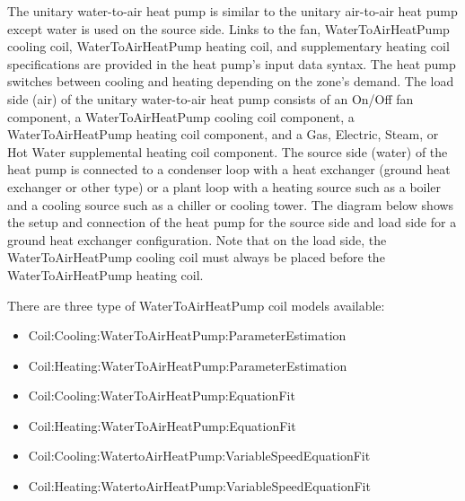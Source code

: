 The unitary water-to-air heat pump is similar to the unitary air-to-air heat pump except water is used on the source side. Links to the fan, WaterToAirHeatPump cooling coil, WaterToAirHeatPump heating coil, and supplementary heating coil specifications are provided in the heat pump's input data syntax. The heat pump switches between cooling and heating depending on the zone's demand. The load side (air) of the unitary water-to-air heat pump consists of an On/Off fan component, a WaterToAirHeatPump cooling coil component, a WaterToAirHeatPump heating coil component, and a Gas, Electric, Steam, or Hot Water supplemental heating coil component. The source side (water) of the heat pump is connected to a condenser loop with a heat exchanger (ground heat exchanger or other type) or a plant loop with a heating source such as a boiler and a cooling source such as a chiller or cooling tower. The diagram below shows the setup and connection of the heat pump for the source side and load side for a ground heat exchanger configuration. Note that on the load side, the WaterToAirHeatPump cooling coil must always be placed before the WaterToAirHeatPump heating coil.

There are three type of WaterToAirHeatPump coil models available:

\begin{itemize}
\item
  Coil:Cooling:WaterToAirHeatPump:ParameterEstimation
\item
  Coil:Heating:WaterToAirHeatPump:ParameterEstimation
\item
  Coil:Cooling:WaterToAirHeatPump:EquationFit
\item
  Coil:Heating:WaterToAirHeatPump:EquationFit
\item
  Coil:Cooling:WatertoAirHeatPump:VariableSpeedEquationFit
\item
  Coil:Heating:WatertoAirHeatPump:VariableSpeedEquationFit
\end{itemize}

